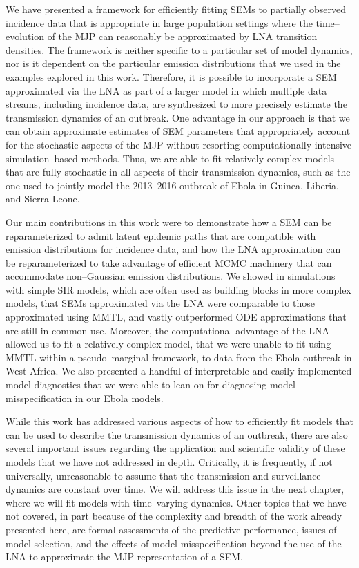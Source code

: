 We have presented a framework for efficiently fitting SEMs to partially observed incidence data that is appropriate in large population settings where the time--evolution of the MJP can reasonably be approximated by LNA transition densities. The framework is neither specific to a particular set of model dynamics, nor is it dependent on the particular emission distributions that we used in the examples explored in this work. Therefore, it is possible to incorporate a SEM approximated via the LNA as part of a larger model in which multiple data streams, including incidence data, are synthesized to more precisely estimate the transmission dynamics of an outbreak. One advantage in our approach is that we can obtain approximate estimates of SEM parameters that appropriately account for the stochastic aspects of the MJP without resorting computationally intensive simulation--based methods. Thus, we are able to fit relatively complex models that are fully stochastic in all aspects of their transmission dynamics, such as the one used to jointly model the 2013--2016 outbreak of Ebola in Guinea, Liberia, and Sierra Leone. 

Our main contributions in this work were to demonstrate how a SEM can be reparameterized to admit latent epidemic paths that are compatible with emission distributions for incidence data, and how the LNA approximation can be reparameterized to take advantage of efficient MCMC machinery that can accommodate non--Gaussian emission distributions. We showed in simulations with simple SIR models, which are often used as building blocks in more complex models, that SEMs approximated via the LNA were comparable to those approximated using MMTL, and vastly outperformed ODE approximations that are still in common use. Moreover, the computational advantage of the LNA allowed us to fit a relatively complex model, that we were unable to fit using MMTL within a pseudo--marginal framework, to data from the Ebola outbreak in West Africa. We also presented a handful of interpretable and easily implemented model diagnostics that we were able to lean on for diagnosing model misspecification in our Ebola models.

While this work has addressed various aspects of how to efficiently fit models that can be used to describe the transmission dynamics of an outbreak, there are also several important issues regarding the application and scientific validity of these models that we have not addressed in depth. Critically, it is frequently, if not universally, unreasonable to assume that the transmission and surveillance dynamics are constant over time. We will address this issue in the next chapter, where we will fit models with time--varying dynamics. Other topics that we have not covered, in part because of the complexity and breadth of the work already presented here, are formal assessments of the predictive performance, issues of model selection, and the effects of model misspecification beyond the use of the LNA to approximate the MJP representation of a SEM.